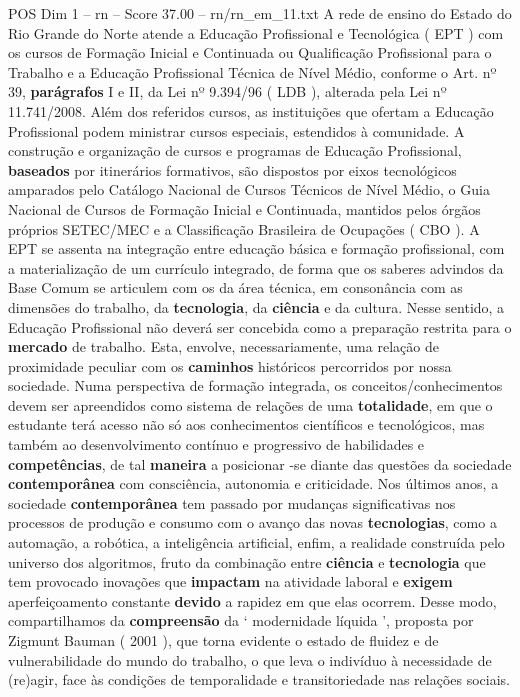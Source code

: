 \begin{textsample}{POS Dim 1 – rn – Score 37.00 – rn/rn\_em\_11.txt}
A rede de ensino do Estado do Rio Grande do Norte atende a Educação Profissional e Tecnológica ( EPT ) com os cursos de Formação Inicial e Continuada ou Qualificação Profissional para o Trabalho e a Educação Profissional Técnica de Nível Médio, conforme o Art. nº 39, \textbf{parágrafos} I e II, da Lei nº 9.394/96 ( LDB ), alterada pela Lei nº 11.741/2008.
Além dos referidos cursos, as instituições que ofertam a Educação Profissional podem ministrar cursos especiais, estendidos à comunidade.
A construção e organização de cursos e programas de Educação Profissional, \textbf{baseados} por itinerários formativos, são dispostos por eixos tecnológicos amparados pelo Catálogo Nacional de Cursos Técnicos de Nível Médio, o Guia Nacional de Cursos de Formação Inicial e Continuada, mantidos pelos órgãos próprios SETEC/MEC e a Classificação Brasileira de Ocupações ( CBO ).
A EPT se assenta na integração entre educação básica e formação profissional, com a materialização de um currículo integrado, de forma que os saberes advindos da Base Comum se articulem com os da área técnica, em consonância com as dimensões do trabalho, da \textbf{tecnologia}, da \textbf{ciência} e da cultura.
Nesse sentido, a Educação Profissional não deverá ser concebida como a preparação restrita para o \textbf{mercado} de trabalho.
Esta, envolve, necessariamente, uma relação de proximidade peculiar com os \textbf{caminhos} históricos percorridos por nossa sociedade.
Numa perspectiva de formação integrada, os conceitos/conhecimentos devem ser apreendidos como sistema de relações de uma \textbf{totalidade}, em que o estudante terá acesso não só aos conhecimentos científicos e tecnológicos, mas também ao desenvolvimento contínuo e progressivo de habilidades e \textbf{competências}, de tal \textbf{maneira} a posicionar -se diante das questões da sociedade \textbf{contemporânea} com consciência, autonomia e criticidade.
Nos últimos anos, a sociedade \textbf{contemporânea} tem passado por mudanças significativas nos processos de produção e consumo com o avanço das novas \textbf{tecnologias}, como a automação, a robótica, a inteligência artificial, enfim, a realidade construída pelo universo dos algoritmos, fruto da combinação entre \textbf{ciência} e \textbf{tecnologia} que tem provocado inovações que \textbf{impactam} na atividade laboral e \textbf{exigem} aperfeiçoamento constante \textbf{devido} a rapidez em que elas ocorrem.
Desse modo, compartilhamos da \textbf{compreensão} da ‘ modernidade líquida ’, proposta por Zigmunt Bauman ( 2001 ), que torna evidente o estado de fluidez e de vulnerabilidade do mundo do trabalho, o que leva o indivíduo à necessidade de (re)agir, face às condições de temporalidade e transitoriedade nas relações sociais.

\end{textsample}
